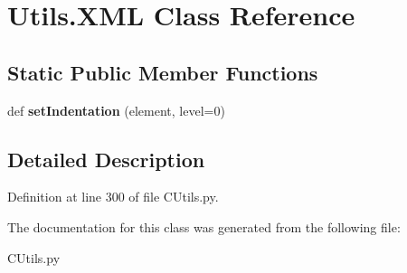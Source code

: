 \hypertarget{class_c_utils_1_1_utils_1_1_x_m_l}{}\section{Utils.\+X\+ML Class Reference}
\label{class_c_utils_1_1_utils_1_1_x_m_l}
\subsection*{Static Public Member Functions}
\begin{DoxyCompactItemize}
\item 
\mbox{\label{class_c_utils_1_1_utils_1_1_x_m_l_a8e038477269c672280de07d7a9dae7f5}} 
def {\bfseries set\+Indentation} (element, level=0)
\end{DoxyCompactItemize}


\subsection{Detailed Description}


Definition at line 300 of file C\+Utils.\+py.



The documentation for this class was generated from the following file\+:\begin{DoxyCompactItemize}
\item 
C\+Utils.\+py\end{DoxyCompactItemize}
